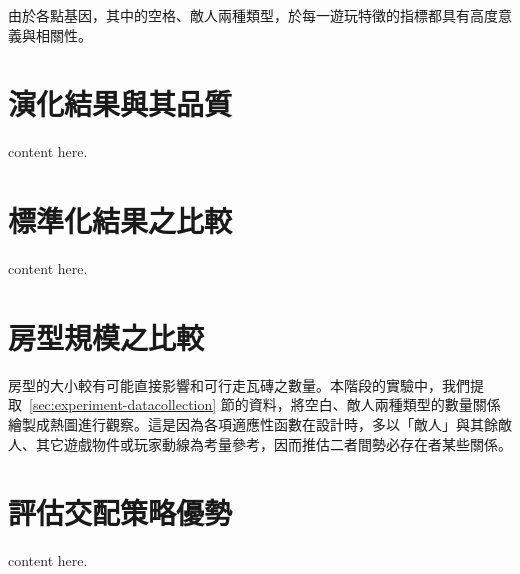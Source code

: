 由於各點基因，其中的空格、敵人兩種類型，於每一遊玩特徵的指標都具有高度意義與相關性。

\section{演化結果與其品質}
\label{sec:experiment-xxx}

content here.

\section{標準化結果之比較}
\label{sec:experiment-normalized}

content here.

\section{房型規模之比較}
\label{sec:experiment-yyy}

房型的大小較有可能直接影響和可行走瓦磚之數量。本階段的實驗中，我們提取~\ref{sec:experiment-datacollection} 節的資料，將空白、敵人兩種類型的數量關係繪製成熱圖進行觀察。這是因為各項適應性函數在設計時，多以「敵人」與其餘敵人、其它遊戲物件或玩家動線為考量參考，因而推估二者間勢必存在者某些關係。

\section{評估交配策略優勢}
\label{sec:experiment-zzzz}

content here.

